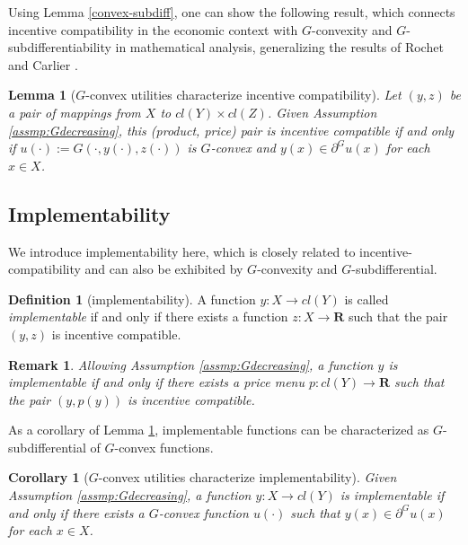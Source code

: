 \documentclass[a4paper, 11pt]{amsart}
\numberwithin{equation}{section}
\theoremstyle{plain}
\newtheorem{corollary}[theorem]{Corollary}
\newtheorem{lemma}[theorem]{Lemma}
\newtheorem{remark}[theorem]{Remark}
\theoremstyle{definition}
\newtheorem{definition}[theorem]{Definition}
\theoremstyle{remark}
\newcommand{\R}{\mathbf{R}}
\begin{document}
Using Lemma \ref{convex-subdiff}, one can show the following result,  %
	which connects incentive compatibility in the economic context with $G$-convexity and $G$-subdifferentiability in mathematical analysis, generalizing the results of Rochet \cite{Rochet87} and Carlier \cite{Carlier01}.

\begin{lemma}[$G$-convex utilities characterize incentive compatibility]\label{incen/convex}
	Let $(y,z)$ be a pair of mappings from $X$ to $cl(Y) \times cl(Z)$. Given Assumption \ref{assmp:Gdecreasing}, this (product, price) pair is incentive compatible %
	if and only if $u(\cdot):=G(\cdot,y(\cdot),z(\cdot))$ is $G$-convex and $y(x)\in \partial^G u(x)$ for each $x \in X$.
\end{lemma}


\subsection{Implementability}\label{subsection:implementability}
{We introduce implementability here, which is closely related to incentive-compatibility and can also be exhibited by $G$-convexity and $G$-subdifferential. %
	
	\begin{definition}[implementability]
		A function $y: X \longrightarrow cl(Y)$ is called \textit{implementable} if and only if there exists a function $z: X \longrightarrow \R$  such that the pair $(y, z)$ is incentive compatible.
	\end{definition}
	
	\begin{remark}\label{rmk:implementability}
		Allowing Assumption \ref{assmp:Gdecreasing}, a function $y$ is implementable if and only if there exists a price menu $p: cl(Y) \longrightarrow \R$ such that the pair $(y, p(y))$ is incentive compatible.
	\end{remark}
	
	
	As a corollary of Lemma \ref{incen/convex},  implementable functions can be characterized as $G$-subdifferential of $G$-convex functions. 
	
	
	\begin{corollary}[$G$-convex utilities characterize implementability]\label{cor:implementable}
		Given Assumption \ref{assmp:Gdecreasing}, a function $y: X \longrightarrow cl(Y)$ is implementable if and only if there exists a $G$-convex function $u(\cdot)$ such that $y(x) \in \partial^G u(x)$ for each $x\in X$.
	\end{corollary}
}
\end{document}
